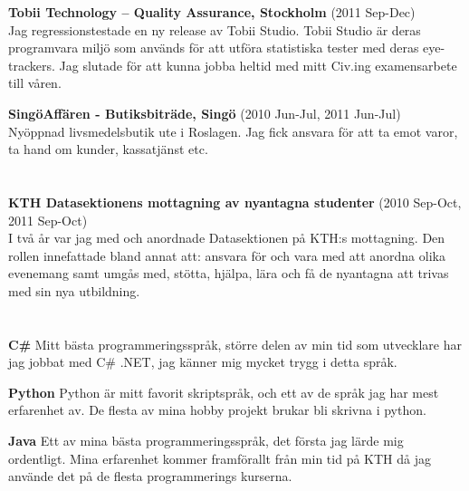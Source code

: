 \documentclass[margin,line]{resume}%
\begin{document}
\begin{resume}
		\textbf{Tobii Technology – Quality Assurance, Stockholm} (2011 Sep-Dec)\\
		Jag regressionstestade en ny release av Tobii Studio. Tobii Studio är deras
		programvara miljö som används för att utföra statistiska tester med deras
		eye-trackers. Jag slutade för att kunna jobba heltid med mitt Civ.ing
		examensarbete till våren.

		\textbf{SingöAffären - Butiksbiträde, Singö} (2010 Jun-Jul, 2011 Jun-Jul)\\
		Nyöppnad livsmedelsbutik ute i Roslagen. Jag fick ansvara för att ta emot varor, ta
		hand om kunder, kassatjänst etc.

	\section{}\vspace{0.001mm}

		\textbf{KTH Datasektionens mottagning av nyantagna studenter} (2010
		Sep-Oct, 2011 Sep-Oct)\\
		I två år var jag med och anordnade Datasektionen på KTH:s mottagning. Den
		rollen innefattade bland annat att: ansvara för och vara med att anordna
		olika evenemang samt umgås med, stötta, hjälpa, lära och få de nyantagna att trivas
		med sin nya utbildning.

	   \section{}\vspace{0.001mm}

		\textbf{C\#}\hspace{0.5cm}
		Mitt bästa programmeringsspråk, större delen av min tid som utvecklare
		har jag jobbat med C\# .NET, jag känner mig mycket trygg i detta språk.

		\textbf{Python}\hspace{0.5cm}
		Python är mitt favorit skriptspråk, och ett av de språk jag har mest
		erfarenhet av. De flesta av mina hobby projekt brukar bli skrivna i python.

		\textbf{Java}\hspace{0.5cm}
		Ett av mina bästa programmeringsspråk, det första jag lärde mig
		ordentligt. Mina erfarenhet kommer framförallt från min tid på KTH då
		jag använde det på de flesta programmerings kurserna.


\end{resume}
\end{document}
